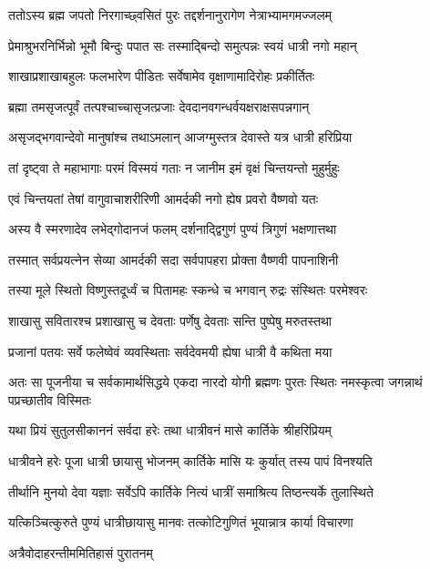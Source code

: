 \twolineshloka
{ततोऽस्य ब्रह्म जपतो निरगाच्छ्वसितं पुरः}
{तद्दर्शनानुरागेण नेत्राभ्यामगमज्जलम्} %

\twolineshloka
{प्रेमाश्रुभरनिर्भिन्नो भूमौ बिन्दुः पपात सः}
{तस्माद्बिन्दो समुत्पन्नः स्वयं धात्री नगो महान्} %

\twolineshloka
{शाखाप्रशाखाबहुलः फलभारेण पीडितः}
{सर्वेषामेव वृक्षाणामादिरोहः प्रकीर्तितः} %

\twolineshloka
{ब्रह्मा तमसृजत्पूर्वं तत्पश्चाच्चासृजत्प्रजाः}
{देवदानवगन्धर्वयक्षराक्षसपन्नगान्} %

\twolineshloka
{असृजद्भगवान्देवो मानुषांश्च तथाऽमलान्}
{आजग्मुस्तत्र देवास्ते यत्र धात्री हरिप्रिया} %

\twolineshloka
{तां दृष्ट्वा ते महाभागाः परमं विस्मयं गताः}
{न जानीम इमं वृक्षं चिन्तयन्तो मुहुर्मुहुः} %

\twolineshloka
{एवं चिन्तयतां तेषां वागुवाचाशरीरिणी}
{आमर्दकी नगो ह्येष प्रवरो वैष्णवो यतः} %

\twolineshloka
{अस्य वै स्मरणादेव लभेद्गोदानजं फलम्}
{दर्शनाद्द्विगुणं पुण्यं त्रिगुणं भक्षणात्तथा} %

\twolineshloka
{तस्मात् सर्वप्रयत्नेन सेव्या आमर्दकी सदा}
{सर्वपापहरा प्रोक्ता वैष्णवी पापनाशिनी} %

\twolineshloka
{तस्या मूले स्थितो विष्णुस्तदूर्ध्वं च पितामहः}
{स्कन्धे च भगवान् रुद्रः संस्थितः परमेश्वरः} %

\twolineshloka
{शाखासु सवितारश्च प्रशाखासु च देवताः}
{पर्णेषु देवताः सन्ति पुष्पेषु मरुतस्तथा} %

\twolineshloka
{प्रजानां पतयः सर्वे फलेष्वेवं व्यवस्थिताः}
{सर्वदेवमयी ह्येषा धात्री वै कथिता मया} %

\threelineshloka
{अतः सा पूजनीया च सर्वकामार्थसिद्धये}
{एकदा नारदो योगी ब्रह्मणः पुरतः स्थितः}
{नमस्कृत्वा जगन्नाथं पप्रच्छातीव विस्मितः} %


\twolineshloka
{यथा प्रियं सुतुलसीकाननं सर्वदा हरेः}
{तथा धात्रीवनं मासे कार्तिके श्रीहरिप्रियम्} %


\twolineshloka
{धात्रीवने हरेः पूजा धात्री छायासु भोजनम्}
{कार्तिके मासि यः कुर्यात् तस्य पापं विनश्यति} %

\twolineshloka
{तीर्थानि मुनयो देवा यज्ञाः सर्वेऽपि कार्तिके}
{नित्यं धात्रीं समाश्रित्य तिष्ठन्त्यर्के तुलास्थिते} %

\twolineshloka
{यत्किञ्चित्कुरुते पुण्यं धात्रीछायासु मानवः}
{तत्कोटिगुणितं भूयान्नात्र कार्या विचारणा} %


\onelineshloka
{अत्रैवोदाहरन्तीममितिहासं पुरातनम्} %

